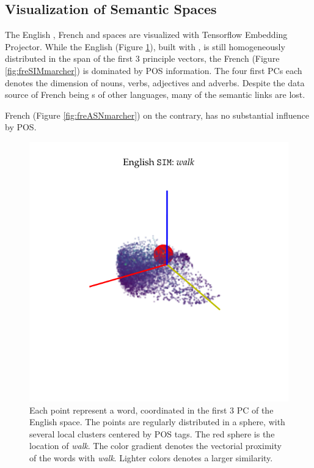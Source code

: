 \subsection{Visualization of Semantic Spaces}
\label{appsubsec:projectorvisu}

The English , French  and  spaces are visualized with Tensorflow Embedding Projector. While the English  (Figure \ref{fig:engSIMwalk}), built with , is still homogeneously distributed in the span of the first 3 principle vectors, the French  (Figure \ref{fig:freSIMmarcher}) is dominated by POS information. The four first PCs each denotes the dimension of nouns, verbs, adjectives and adverbs. Despite the data source of French  being s of other languages, many of the semantic links are lost.

French  (Figure \ref{fig:freASNmarcher}) on the contrary, has no substantial influence by POS. 

\begin{figure}
    \centering
    \includegraphics[clip, trim=1cm 1.5cm 2cm 0.2cm, scale=1]{Figures/EngSIMPCAforwalk.pdf}
    \caption[English  Space Visualization]{Each point represent a word, coordinated in the first 3 PC of the English  space. The points are regularly distributed in a sphere, with several local clusters centered by POS tags. The red sphere is the location of \emph{walk}. The color gradient denotes the vectorial proximity of the words with \emph{walk}. Lighter colors denotes a larger similarity.}
    \label{fig:engSIMwalk}
\end{figure}

